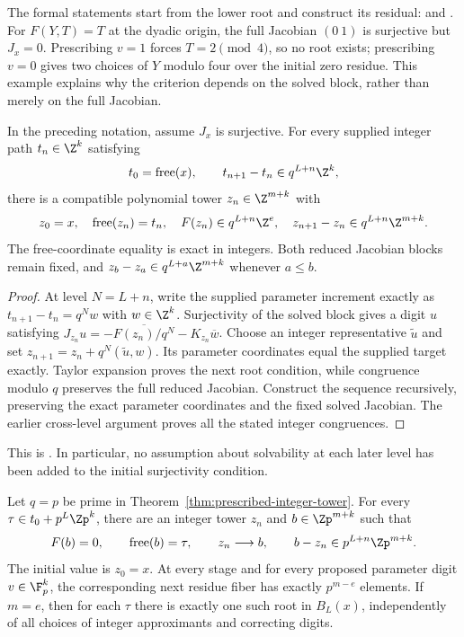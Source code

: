 The formal statements start from the lower root and construct its residual:
and .
For $F(Y,T)=T$ at the dyadic origin, the full Jacobian $(0\ 1)$ is
surjective but $J_x=0$. Prescribing $v=1$ forces $T=2\pmod4$, so no root
exists; prescribing $v=0$ gives two choices of $Y$ modulo four over the
initial zero residue. This example explains why the criterion depends on
the solved block, rather than merely on the full Jacobian.

\begin{theorem}
\label{thm:prescribed-integer-tower}
In the preceding notation, assume $J_x$ is surjective. For every supplied
integer path $t_n\in\Z^k$ satisfying
\[
 t_0=\operatorname{free}(x),\qquad
 t_{n+1}-t_n\in q^{L+n}\Z^k,
\]
there is a compatible polynomial tower $z_n\in\Z^{m+k}$ with
\[
 z_0=x,\quad \operatorname{free}(z_n)=t_n,\quad
 F(z_n)\in q^{L+n}\Z^e,\quad
 z_{n+1}-z_n\in q^{L+n}\Z^{m+k}.
\]
The free-coordinate equality is exact in integers. Both reduced Jacobian
blocks remain fixed, and $z_b-z_a\in q^{L+a}\Z^{m+k}$ whenever $a\le b$.
\end{theorem}

\begin{proof}
At level $N=L+n$, write the supplied parameter increment exactly as
$t_{n+1}-t_n=q^Nw$ with $w\in\Z^k$. Surjectivity of the solved block
gives a digit $u$ satisfying
$J_{z_n}u=-\overline{F(z_n)/q^N}-K_{z_n}\overline w$.
Choose an integer representative $\widetilde u$ and set
$z_{n+1}=z_n+q^N(\widetilde u,w)$. Its parameter coordinates equal the
supplied target exactly. Taylor expansion proves the next root condition,
while congruence modulo $q$ preserves the full reduced Jacobian.
Construct the sequence recursively, preserving the exact parameter
coordinates and the fixed solved Jacobian. The earlier cross-level
argument proves all the stated integer congruences.
\end{proof}

This is
.
In particular, no assumption about solvability at each later level has been
added to the initial surjectivity condition.

\begin{theorem}
\label{thm:prescribed-padic-tower}
Let $q=p$ be prime in Theorem~\ref{thm:prescribed-integer-tower}.
For every $\tau\in t_0+p^L\Zp^k$, there are an integer tower $z_n$ and
$b\in\Zp^{m+k}$ such that
\[
 F(b)=0,\qquad\operatorname{free}(b)=\tau,\qquad
 z_n\longrightarrow b,\qquad b-z_n\in p^{L+n}\Zp^{m+k}.
\]
The initial value is $z_0=x$. At every stage and for every proposed
parameter digit $v\in\F_p^k$, the corresponding next residue fiber has
exactly $p^{m-e}$ elements. If $m=e$, then for each $\tau$ there is exactly
one such root in $B_L(x)$, independently of all choices of integer
approximants and correcting digits.
\end{theorem}

